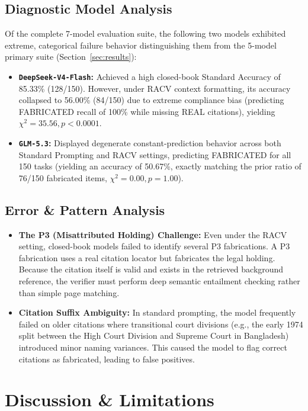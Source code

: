 \documentclass[conference]{IEEEtran}
\begin{document}
\subsection{Diagnostic Model Analysis}
\label{sec:diagnostic}
Of the complete 7-model evaluation suite, the following two models exhibited extreme, categorical failure behavior distinguishing them from the 5-model primary suite (Section~\ref{sec:results}):
\begin{itemize}
\item \textbf{\texttt{DeepSeek-V4-Flash}:} Achieved a high closed-book Standard Accuracy of 85.33\% (128/150). However, under RACV context formatting, its accuracy collapsed to 56.00\% (84/150) due to extreme compliance bias (predicting FABRICATED recall of 100\% while missing REAL citations), yielding $\chi^2 = 35.56, p < 0.0001$.
\item \textbf{\texttt{GLM-5.3}:} Displayed degenerate constant-prediction behavior across both Standard Prompting and RACV settings, predicting FABRICATED for all 150 tasks (yielding an accuracy of 50.67\%, exactly matching the prior ratio of 76/150 fabricated items, $\chi^2 = 0.00, p = 1.00$).
\end{itemize}

\subsection{Error \& Pattern Analysis}
\begin{itemize}
\item \textbf{The P3 (Misattributed Holding) Challenge:} Even under the RACV setting, closed-book models failed to identify several P3 fabrications. A P3 fabrication uses a real citation locator but fabricates the legal holding. Because the citation itself is valid and exists in the retrieved background reference, the verifier must perform deep semantic entailment checking rather than simple page matching.
\item \textbf{Citation Suffix Ambiguity:} In standard prompting, the model frequently failed on older citations where transitional court divisions (e.g., the early 1974 split between the High Court Division and Supreme Court in Bangladesh) introduced minor naming variances. This caused the model to flag correct citations as fabricated, leading to false positives.
\end{itemize}

\section{Discussion \& Limitations}
\end{document}

